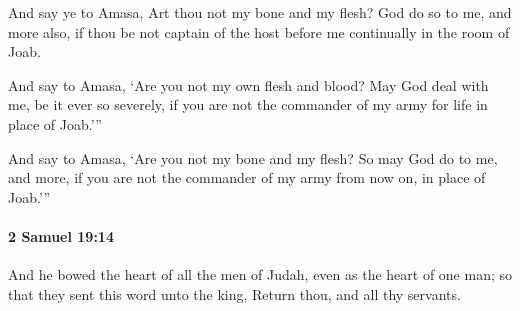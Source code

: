 			\begin{versebox}
					\item[BHS] 
					\item[ASV] And say ye to Amasa, Art thou not my bone and my flesh? God do so to me, and more also, if thou be not captain of the host before me continually in the room of Joab.
					\item[NIV] And say to Amasa, ‘Are you not my own flesh and blood? May God deal with me, be it ever so severely, if you are not the commander of my army for life in place of Joab.’”
					\item[NRSV] And say to Amasa, ‘Are you not my bone and my flesh? So may God do to me, and more, if you are not the commander of my army from now on, in place of Joab.’”
			\end{versebox}

		\paragraph{2 Samuel 19:14} %
			\label{2SAMUEL-19-14}

			And he bowed the heart of all the men of Judah, even as the heart of one man; so that they sent this word unto the king, Return thou, and all thy servants.

